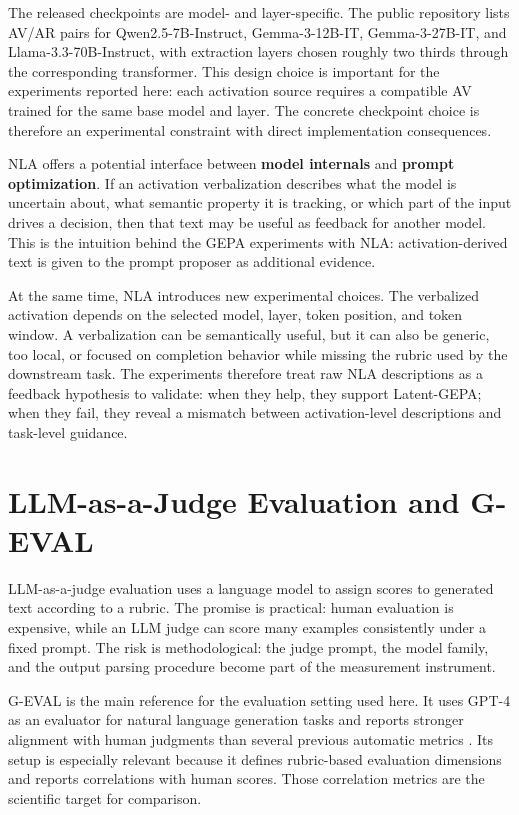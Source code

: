 \documentclass[12pt,a4paper,twoside,openright]{book}
\begin{document}
The released checkpoints are model- and layer-specific. The public repository
lists AV/AR pairs for Qwen2.5-7B-Instruct, Gemma-3-12B-IT,
Gemma-3-27B-IT, and Llama-3.3-70B-Instruct, with extraction layers chosen
roughly two thirds through the corresponding transformer. This design choice is
important for the experiments reported here: each activation source requires a
compatible AV trained for the same base model and layer. The concrete checkpoint
choice is therefore an experimental constraint with direct implementation
consequences.

NLA offers a potential interface between \textbf{model internals} and
\textbf{prompt optimization}. If an
activation verbalization describes what the model is uncertain about, what
semantic property it is tracking, or which part of the input drives a decision,
then that text may be useful as feedback for another model. This is the
intuition behind the GEPA experiments with NLA: activation-derived text is
given to the prompt proposer as additional evidence.

At the same time, NLA introduces new experimental choices. The verbalized
activation depends on the selected model, layer, token position, and token
window. A verbalization can be semantically useful, but it can also be generic,
too local, or focused on completion behavior while missing the rubric used by
the downstream task. The experiments therefore treat raw NLA descriptions as a
feedback hypothesis to validate: when they help, they support Latent-GEPA; when
they fail, they reveal a mismatch between activation-level descriptions and
task-level guidance.

\section{LLM-as-a-Judge Evaluation and G-EVAL}
\label{sec:related-geval}

LLM-as-a-judge evaluation uses a language model to assign scores to generated
text according to a rubric. The promise is practical: human evaluation is
expensive, while an LLM judge can score many examples consistently under a
fixed prompt. The risk is methodological: the judge prompt, the model family,
and the output parsing procedure become part of the measurement instrument.

G-EVAL is the main reference for the evaluation setting used here. It uses
GPT-4 as an evaluator for natural language generation tasks and reports stronger
alignment with human judgments than several previous automatic metrics
\cite{DBLP:conf/emnlp/LiuIXWXZ23}. Its setup is especially relevant because it defines
rubric-based evaluation dimensions and reports correlations with human scores.
Those correlation metrics are the scientific target for comparison.
\end{document}
